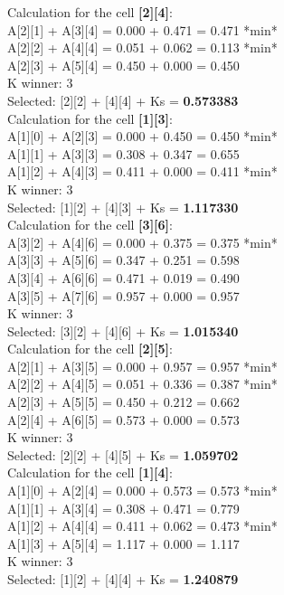 \documentclass[a4paper,twocolumn,10pt]{article}
\newcommand\tab[1][1cm]{\hspace*{#1}}
\newcommand\minitab[1][0.5cm]{\hspace*{#1}}
\begin{document}
Calculation for the cell \textbf{[2][4]}: \\ 
\tab A[2][1] + A[3][4] = 0.000 + 0.471 = 0.471 *min*\\ 
\tab A[2][2] + A[4][4] = 0.051 + 0.062 = 0.113 *min*\\ 
\tab A[2][3] + A[5][4] = 0.450 + 0.000 = 0.450\\ 
\minitab K winner: 3 \\ 
\minitab Selected: [2][2] + [4][4] + Ks = \textbf{0.573383} \\ 
 
Calculation for the cell \textbf{[1][3]}: \\ 
\tab A[1][0] + A[2][3] = 0.000 + 0.450 = 0.450 *min*\\ 
\tab A[1][1] + A[3][3] = 0.308 + 0.347 = 0.655\\ 
\tab A[1][2] + A[4][3] = 0.411 + 0.000 = 0.411 *min*\\ 
\minitab K winner: 3 \\ 
\minitab Selected: [1][2] + [4][3] + Ks = \textbf{1.117330} \\ 
 
Calculation for the cell \textbf{[3][6]}: \\ 
\tab A[3][2] + A[4][6] = 0.000 + 0.375 = 0.375 *min*\\ 
\tab A[3][3] + A[5][6] = 0.347 + 0.251 = 0.598\\ 
\tab A[3][4] + A[6][6] = 0.471 + 0.019 = 0.490\\ 
\tab A[3][5] + A[7][6] = 0.957 + 0.000 = 0.957\\ 
\minitab K winner: 3 \\ 
\minitab Selected: [3][2] + [4][6] + Ks = \textbf{1.015340} \\ 
 
Calculation for the cell \textbf{[2][5]}: \\ 
\tab A[2][1] + A[3][5] = 0.000 + 0.957 = 0.957 *min*\\ 
\tab A[2][2] + A[4][5] = 0.051 + 0.336 = 0.387 *min*\\ 
\tab A[2][3] + A[5][5] = 0.450 + 0.212 = 0.662\\ 
\tab A[2][4] + A[6][5] = 0.573 + 0.000 = 0.573\\ 
\minitab K winner: 3 \\ 
\minitab Selected: [2][2] + [4][5] + Ks = \textbf{1.059702} \\ 
 
Calculation for the cell \textbf{[1][4]}: \\ 
\tab A[1][0] + A[2][4] = 0.000 + 0.573 = 0.573 *min*\\ 
\tab A[1][1] + A[3][4] = 0.308 + 0.471 = 0.779\\ 
\tab A[1][2] + A[4][4] = 0.411 + 0.062 = 0.473 *min*\\ 
\tab A[1][3] + A[5][4] = 1.117 + 0.000 = 1.117\\ 
\minitab K winner: 3 \\ 
\minitab Selected: [1][2] + [4][4] + Ks = \textbf{1.240879} \\ 
 
\end{document}
